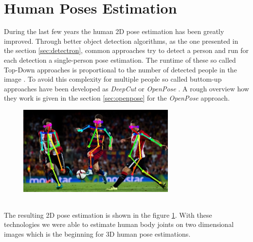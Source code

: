 \section{Human Poses Estimation}
During the last few years the human 2D pose estimation has been greatly improved. Through better object detection algorithms, as the one presented in the section \ref{sec:detectron}, common approaches try to detect a person and run for each detection a single-person pose estimation. The runtime of these so called Top-Down approaches is proportional to the number of detected people in the image \cite{openpose_paper}. To avoid this complexity for multiple people so called buttom-up approaches have been developed as \textit{DeepCut} \cite{deepcut} or \textit{OpenPose} \cite{openpose_paper}. A rough overview how they work is given in the section \ref{sec:openpose} for the \textit{OpenPose} approach. 
\begin{figure}[h]
	\centering
	\includegraphics[width=0.7\textwidth]{./images/openpose_example.jpg}
	\label{fig:openpose_example}
\end{figure}\\
The resulting 2D pose estimation is shown in the figure \ref{fig:openpose_example}. With these technologies we were able to estimate human body joints on two dimensional images which is the beginning for 3D human pose estimations.

